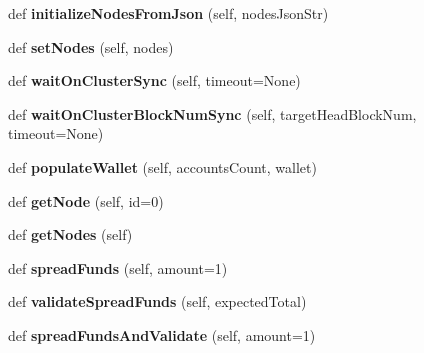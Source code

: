 \begin{DoxyCompactItemize}
\item 
\mbox{\label{classtest_utils_1_1_cluster_acba27e24298f87e645383aff644ff400}} 
def {\bfseries initialize\+Nodes\+From\+Json} (self, nodes\+Json\+Str)
\item 
\mbox{\label{classtest_utils_1_1_cluster_a5e03ab3e67903633aaac66dadfecc675}} 
def {\bfseries set\+Nodes} (self, nodes)
\item 
\mbox{\label{classtest_utils_1_1_cluster_a35de9df4b8fa6eacb2320ed335600446}} 
def {\bfseries wait\+On\+Cluster\+Sync} (self, timeout=None)
\item 
\mbox{\label{classtest_utils_1_1_cluster_a57635b6d142f636fb6914250445f2b0a}} 
def {\bfseries wait\+On\+Cluster\+Block\+Num\+Sync} (self, target\+Head\+Block\+Num, timeout=None)
\item 
\mbox{\label{classtest_utils_1_1_cluster_af5a3fb7ce6b573a4f34e71eaa349b5a8}} 
def {\bfseries populate\+Wallet} (self, accounts\+Count, wallet)
\item 
\mbox{\label{classtest_utils_1_1_cluster_a91bb2bd836c1f7f611a6b4b1e8c07719}} 
def {\bfseries get\+Node} (self, id=0)
\item 
\mbox{\label{classtest_utils_1_1_cluster_a2a9b2bc012b11d5af2ef0d82623bd692}} 
def {\bfseries get\+Nodes} (self)
\item 
\mbox{\label{classtest_utils_1_1_cluster_a4b8dce6cbcf777b9772a7a17b3372a90}} 
def {\bfseries spread\+Funds} (self, amount=1)
\item 
\mbox{\label{classtest_utils_1_1_cluster_ae33991fe4cca48134e92530cb8227dc5}} 
def {\bfseries validate\+Spread\+Funds} (self, expected\+Total)
\item 
\mbox{\label{classtest_utils_1_1_cluster_a10714a2d2292fa7eef30550635272518}} 
def {\bfseries spread\+Funds\+And\+Validate} (self, amount=1)
\item 

\end{DoxyCompactItemize}
